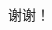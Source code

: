 \documentclass[CJK, 10pt]{beamer}
\begin{document}
\begin{CJK*}{UTF8}{gbsn}
\begin{frame}[plain]
    \begin{center}
        谢谢！
    \end{center}
\end{frame}

\end{CJK*}
\end{document}
